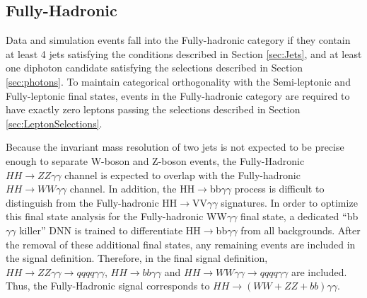 \subsection{Fully-Hadronic} \label{subsec:FullyHadronicEventSelection}

Data and simulation events fall into the Fully-hadronic category if they contain at least 4 jets satisfying the conditions described in Section \ref{sec:Jets}, and at least one diphoton candidate satisfying the selections described in Section \ref{sec:photons}. To maintain categorical orthogonality with the Semi-leptonic and Fully-leptonic final states, events in the Fully-hadronic category are required to have exactly zero leptons passing the
selections described in Section \ref{sec:LeptonSelections}. 

Because the invariant mass resolution of two jets is not expected to be precise enough to separate W-boson and Z-boson events, the Fully-Hadronic $HH \rightarrow ZZ\gamma\gamma$
channel is expected to overlap with the Fully-hadronic $HH \rightarrow WW\gamma\gamma$ channel. In addition, the HH$\rightarrow$bb$\gamma\gamma$ process is difficult to distinguish from the Fully-hadronic HH$\rightarrow$VV$\gamma\gamma$ signatures. In order to optimize this final state analysis for the Fully-hadronic WW$\gamma\gamma$ final state, a dedicated ``bb$\gamma\gamma$ killer'' DNN is trained to differentiate HH$\rightarrow$bb$\gamma\gamma$ from all backgrounds. After the removal of these additional final states, any remaining events are included in the signal definition.
Therefore, in the final signal definition, $HH \rightarrow ZZ\gamma\gamma \rightarrow qqqq\gamma\gamma$, $HH \rightarrow bb\gamma\gamma$ and $HH \rightarrow WW\gamma\gamma \rightarrow qqqq\gamma\gamma$ are included. Thus, the Fully-Hadronic signal corresponds to $HH \rightarrow (WW + ZZ + bb) \gamma \gamma$. 





